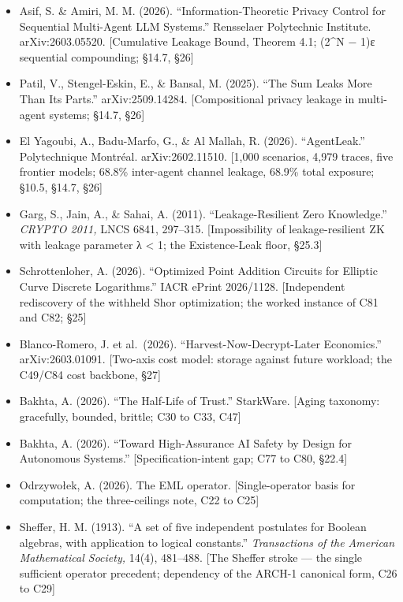 \documentclass[
  11pt,
]{article}
\providecommand{\tightlist}{%
  \setlength{\itemsep}{0pt}\setlength{\parskip}{0pt}}
\begin{document}
\begin{itemize}
\tightlist
\item
  Asif, S. \& Amiri, M. M. (2026). ``Information-Theoretic Privacy
  Control for Sequential Multi-Agent LLM Systems.'' Rensselaer
  Polytechnic Institute. arXiv:2603.05520. {[}Cumulative Leakage Bound,
  Theorem 4.1; (2\^{}N − 1)ε sequential compounding; §14.7, §26{]}
\item
  Patil, V., Stengel-Eskin, E., \& Bansal, M. (2025). ``The Sum Leaks
  More Than Its Parts.'' arXiv:2509.14284. {[}Compositional privacy
  leakage in multi-agent systems; §14.7, §26{]}
\item
  El Yagoubi, A., Badu-Marfo, G., \& Al Mallah, R. (2026).
  ``AgentLeak.'' Polytechnique Montréal. arXiv:2602.11510. {[}1,000
  scenarios, 4,979 traces, five frontier models; 68.8\% inter-agent
  channel leakage, 68.9\% total exposure; §10.5, §14.7, §26{]}
\item
  Garg, S., Jain, A., \& Sahai, A. (2011). ``Leakage-Resilient Zero
  Knowledge.'' \emph{CRYPTO 2011,} LNCS 6841, 297--315. {[}Impossibility
  of leakage-resilient ZK with leakage parameter λ \textless{} 1; the
  Existence-Leak floor, §25.3{]}
\item
  Schrottenloher, A. (2026). ``Optimized Point Addition Circuits for
  Elliptic Curve Discrete Logarithms.'' IACR ePrint 2026/1128.
  {[}Independent rediscovery of the withheld Shor optimization; the
  worked instance of C81 and C82; §25{]}
\item
  Blanco-Romero, J. et al.~(2026). ``Harvest-Now-Decrypt-Later
  Economics.'' arXiv:2603.01091. {[}Two-axis cost model: storage against
  future workload; the C49/C84 cost backbone, §27{]}
\item
  Bakhta, A. (2026). ``The Half-Life of Trust.'' StarkWare. {[}Aging
  taxonomy: gracefully, bounded, brittle; C30 to C33, C47{]}
\item
  Bakhta, A. (2026). ``Toward High-Assurance AI Safety by Design for
  Autonomous Systems.'' {[}Specification-intent gap; C77 to C80,
  §22.4{]}
\item
  Odrzywołek, A. (2026). The EML operator. {[}Single-operator basis for
  computation; the three-ceilings note, C22 to C25{]}
\item
  Sheffer, H. M. (1913). ``A set of five independent postulates for
  Boolean algebras, with application to logical constants.''
  \emph{Transactions of the American Mathematical Society,} 14(4),
  481--488. {[}The Sheffer stroke --- the single sufficient operator
  precedent; dependency of the ARCH-1 canonical form, C26 to C29{]}

\end{itemize}
\end{document}
